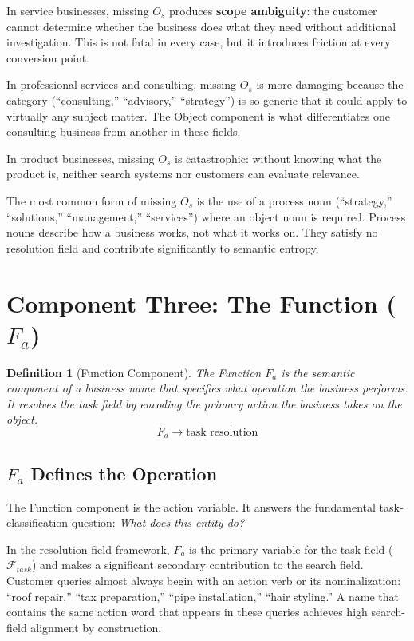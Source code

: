 \documentclass[12pt, openany]{book}
\theoremstyle{thmstyle}
\theoremstyle{defstyle}
\newtheorem{definition}{Definition}[chapter]
\newcommand{\Os}{O_s}
\newcommand{\Fa}{F_a}
\begin{document}
In service businesses, missing $\Os$ produces \textbf{scope ambiguity}: the customer cannot determine whether the business does what they need without additional investigation. This is not fatal in every case, but it introduces friction at every conversion point.

In professional services and consulting, missing $\Os$ is more damaging because the category (``consulting,'' ``advisory,'' ``strategy'') is so generic that it could apply to virtually any subject matter. The Object component is what differentiates one consulting business from another in these fields.

In product businesses, missing $\Os$ is catastrophic: without knowing what the product is, neither search systems nor customers can evaluate relevance.

\begin{warnbox}
The most common form of missing $\Os$ is the use of a process noun (``strategy,'' ``solutions,'' ``management,'' ``services'') where an object noun is required. Process nouns describe how a business works, not what it works on. They satisfy no resolution field and contribute significantly to semantic entropy.
\end{warnbox}

\section{Component Three: The Function ($F_a$)}

\begin{definition}[Function Component]
The Function $\Fa$ is the semantic component of a business name that specifies what operation the business performs. It resolves the task field by encoding the primary action the business takes on the object.
\[
\Fa \rightarrow \text{task resolution}
\]
\end{definition}

\subsection{$F_a$ Defines the Operation}

The Function component is the action variable. It answers the fundamental task-classification question: \textit{What does this entity do?}

In the resolution field framework, $\Fa$ is the primary variable for the task field ($\mathcal{F}_{task}$) and makes a significant secondary contribution to the search field. Customer queries almost always begin with an action verb or its nominalization: ``roof repair,'' ``tax preparation,'' ``pipe installation,'' ``hair styling.'' A name that contains the same action word that appears in these queries achieves high search-field alignment by construction.
\end{document}
